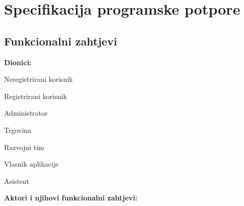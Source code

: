 \chapter{Specifikacija programske potpore}
		
	\section{Funkcionalni zahtjevi}
			
			
				
			
			
			\noindent \textbf{Dionici:}
			 
			\begin{packed_enum}
				
				\item Neregistrirani korisnik
				\item Registrirani korisnik				
				\item Administrator
                \item Trgovina
                \item Razvojni tim
                \item Vlasnik aplikacije
                \item Asistent\\
				
			\end{packed_enum}
   
			
			\noindent \textbf{Aktori i njihovi funkcionalni zahtjevi:}
			
